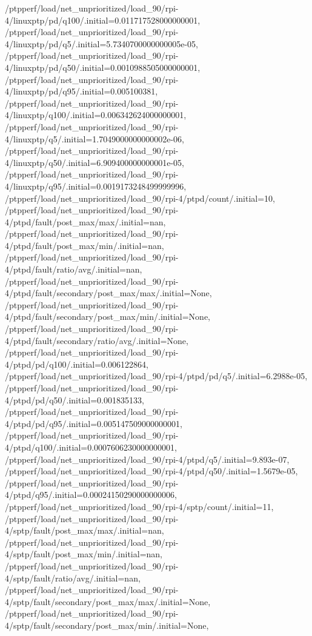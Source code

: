{    /ptpperf/load/net_unprioritized/load_90/rpi-4/linuxptp/pd/q100/.initial=0.011717528000000001,
    /ptpperf/load/net_unprioritized/load_90/rpi-4/linuxptp/pd/q5/.initial=5.7340700000000005e-05,
    /ptpperf/load/net_unprioritized/load_90/rpi-4/linuxptp/pd/q50/.initial=0.0010988505000000001,
    /ptpperf/load/net_unprioritized/load_90/rpi-4/linuxptp/pd/q95/.initial=0.005100381,
    /ptpperf/load/net_unprioritized/load_90/rpi-4/linuxptp/q100/.initial=0.006342624000000001,
    /ptpperf/load/net_unprioritized/load_90/rpi-4/linuxptp/q5/.initial=1.7049000000000002e-06,
    /ptpperf/load/net_unprioritized/load_90/rpi-4/linuxptp/q50/.initial=6.909400000000001e-05,
    /ptpperf/load/net_unprioritized/load_90/rpi-4/linuxptp/q95/.initial=0.0019173248499999996,
    /ptpperf/load/net_unprioritized/load_90/rpi-4/ptpd/count/.initial=10,
    /ptpperf/load/net_unprioritized/load_90/rpi-4/ptpd/fault/post_max/max/.initial=nan,
    /ptpperf/load/net_unprioritized/load_90/rpi-4/ptpd/fault/post_max/min/.initial=nan,
    /ptpperf/load/net_unprioritized/load_90/rpi-4/ptpd/fault/ratio/avg/.initial=nan,
    /ptpperf/load/net_unprioritized/load_90/rpi-4/ptpd/fault/secondary/post_max/max/.initial=None,
    /ptpperf/load/net_unprioritized/load_90/rpi-4/ptpd/fault/secondary/post_max/min/.initial=None,
    /ptpperf/load/net_unprioritized/load_90/rpi-4/ptpd/fault/secondary/ratio/avg/.initial=None,
    /ptpperf/load/net_unprioritized/load_90/rpi-4/ptpd/pd/q100/.initial=0.006122864,
    /ptpperf/load/net_unprioritized/load_90/rpi-4/ptpd/pd/q5/.initial=6.2988e-05,
    /ptpperf/load/net_unprioritized/load_90/rpi-4/ptpd/pd/q50/.initial=0.001835133,
    /ptpperf/load/net_unprioritized/load_90/rpi-4/ptpd/pd/q95/.initial=0.005147509000000001,
    /ptpperf/load/net_unprioritized/load_90/rpi-4/ptpd/q100/.initial=0.0007606230000000001,
    /ptpperf/load/net_unprioritized/load_90/rpi-4/ptpd/q5/.initial=9.893e-07,
    /ptpperf/load/net_unprioritized/load_90/rpi-4/ptpd/q50/.initial=1.5679e-05,
    /ptpperf/load/net_unprioritized/load_90/rpi-4/ptpd/q95/.initial=0.00024150290000000006,
    /ptpperf/load/net_unprioritized/load_90/rpi-4/sptp/count/.initial=11,
    /ptpperf/load/net_unprioritized/load_90/rpi-4/sptp/fault/post_max/max/.initial=nan,
    /ptpperf/load/net_unprioritized/load_90/rpi-4/sptp/fault/post_max/min/.initial=nan,
    /ptpperf/load/net_unprioritized/load_90/rpi-4/sptp/fault/ratio/avg/.initial=nan,
    /ptpperf/load/net_unprioritized/load_90/rpi-4/sptp/fault/secondary/post_max/max/.initial=None,
    /ptpperf/load/net_unprioritized/load_90/rpi-4/sptp/fault/secondary/post_max/min/.initial=None,
}
